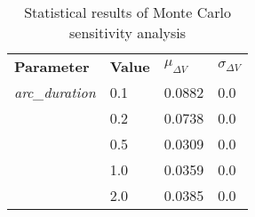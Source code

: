 
                \begin{table}[]
                \centering
                \begin{tabular}{l l l l}
                \rowcolor[HTML]{EFEFEF} \textbf{Parameter} & \textbf{Value} & \textbf{$\mu_{\Delta V}$} & \textbf{$\sigma_{\Delta V}$} \\
                \textit{arc\_duration} & 0.1 & 0.0882 & 0.0 \\
 & 0.2 & 0.0738 & 0.0 \\
 & 0.5 & 0.0309 & 0.0 \\
 & 1.0 & 0.0359 & 0.0 \\
 & 2.0 & 0.0385 & 0.0 \\

                \end{tabular}
                \caption{Statistical results of Monte Carlo sensitivity analysis}
                \label{tab:SensitivityAnalysis}
                \end{table}
                